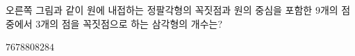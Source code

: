 \hspace*{2mm}\begin{minipage}[t]{\dimexpr\linewidth-2mm\relax}\vspace{0pt}
\noindent\begin{minipage}[t]{0.58\linewidth}\vspace{0pt}\raggedright 오른쪽 그림과 같이 원에 내접하는 정팔각형의 꼭짓점과 원의 중심을 포함한 $9$개의 점 중에서 $3$개의 점을 꼭짓점으로 하는 삼각형의 개수는?\end{minipage}\hfill\begin{minipage}[t]{0.4\linewidth}\vspace{0pt}\centering \resizebox{\ifdim\width>\linewidth\linewidth\else\width\fi}{!}{}\end{minipage}\par
\begin{choices32}{$76$}{$78$}{$80$}{$82$}{$84$}\end{choices32}\end{minipage}
